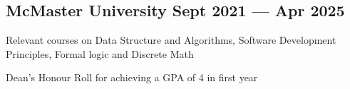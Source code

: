 
\subsection{{McMaster University \hfill Sept 2021 --- Apr 2025}}
\begin{zitemize}
    \item Relevant courses on \hspace{0.05cm}Data Structure and Algorithms, Software Development Principles, Formal logic and Discrete Math
    \item Dean's Honour Roll for achieving a GPA of 4 in first year

\end{zitemize}

